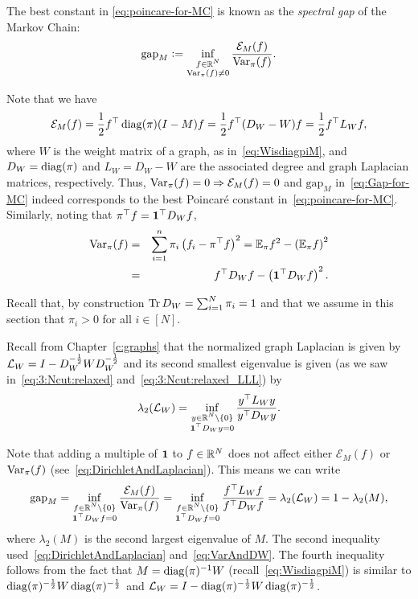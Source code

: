 The best constant in \eqref{eq:poincare-for-MC} is known as the {\em spectral gap} of the Markov Chain:
\begin{equation}\label{eq:Gap-for-MC}
    \mathrm{gap}_M \mathrel{\mathop:}= \inf_{\substack{f\in\mathbb{R}^N \\ \operatorname{Var}_{\pi}(f)\neq 0  }}\frac{\mathcal{E}_M(f)}{\operatorname{Var}_{\pi}(f)}.
\end{equation}

Note that we have
\begin{equation}\label{eq:DirichletAndLaplacian}
    \mathcal{E}_M(f) = \frac12  f^\top \operatorname{diag}(\pi) (I-M) f = \frac12  f^\top (D_W-W) f = \frac12  f^\top L_W f,
\end{equation}
where $W$ is the weight matrix of a graph, as in~\eqref{eq:WisdiagpiM}, and $D_W=\operatorname{diag}(\pi)$ and $L_W=D_W-W$ are the associated degree and graph Laplacian matrices, respectively. Thus, $\operatorname{Var}_{\pi}(f)=0\Rightarrow \mathcal{E}_M(f)=0$ and $\mathrm{gap}_M$ in~\eqref{eq:Gap-for-MC} indeed corresponds to the best Poincar\'e constant in~\eqref{eq:poincare-for-MC}. Similarly, noting that $\pi^\top f = \mathbf{1}^\top D_W f$,
\begin{eqnarray}
    \operatorname{Var}_\pi(f) & = &  \sum_{i=1}^n \pi_i\left( f_i - \pi^\top f \right)^2 = \mathbb{E}_\pi f^2 - \left( \mathbb{E}_\pi f \right)^2  \nonumber\\
    & = & f^\top D_W f - \left(\mathbf{1}^\top D_W f\right)^2. \label{eq:VarAndDW} 
\end{eqnarray}

Recall that, by construction $\operatorname{Tr} D_W = \sum_{i=1}^N \pi_i = 1$ and that we assume in this section that $\pi_i>0$ for all $i\in[N]$.

Recall from Chapter~\ref{c:graphs} that the normalized graph Laplacian is given by $\mathcal{L}_W = I - D_W^{-\frac12} W  D_W^{-\frac12}$ and its second smallest eigenvalue is given (as we saw in~\eqref{eq:3:Ncut:relaxed} and~\eqref{eq:3:Ncut:relaxed_LLL}) by
 $$\lambda_2(\mathcal{L}_W) = \inf_{\substack{y\in\mathbb{R}^N\setminus\{0\} \\ \mathbf{1}^\top D_W y = 0}}   \frac{y^\top L_W y}{y^\top D_W y}.$$

Note that adding a multiple of $\mathbf{1}$ to $f\in\mathbb{R}^N$ does not affect either $\mathcal{E}_M(f)$ or $\operatorname{Var}_\pi(f)$ (see~\eqref{eq:DirichletAndLaplacian}). This means we can write
\[
\mathrm{gap}_M = \inf_{\substack{f\in\mathbb{R}^N\setminus \{0\}\\ \mathbf{1}^\top D_W f=0  }}\frac{\mathcal{E}_M(f)}{\operatorname{Var}_{\pi}(f)} = \inf_{\substack{f\in\mathbb{R}^N\setminus \{0\}\\ \mathbf{1}^\top D_W f=0  }}\frac{f^\top L_W f}{f^\top D_W f} = \lambda_2(\mathcal{L}_W) = 1-\lambda_2(M),
\]
where $\lambda_2(M)$ is the second largest eigenvalue of $M$. The second inequality used~\eqref{eq:DirichletAndLaplacian} and~\eqref{eq:VarAndDW}. The fourth inequality follows from the fact that $M=\operatorname{diag}(\pi)^{-1}W$ (recall~\eqref{eq:WisdiagpiM}) is similar to $\operatorname{diag}(\pi)^{-\frac12}W\operatorname{diag}(\pi)^{-\frac12}$ and $\mathcal{L}_W = I - \operatorname{diag}(\pi)^{-\frac12}W\operatorname{diag}(\pi)^{-\frac12}$.





